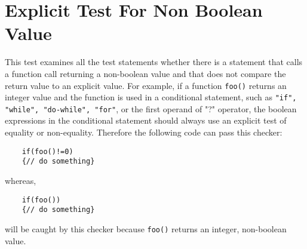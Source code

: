 %
%

\section{Explicit Test For Non Boolean Value}
\label{ExplicitTestForNonBooleanValue::overview}

   This test examines all the test statements whether there is a statement that calls a function call returning a non-boolean value and that does not compare the return value to an explicit value.
   For example, if a function \texttt{foo()} returns an integer value and the function is used in a conditional statement, such as \texttt{"if", "while", "do-while", "for"}, or the first operand of "?" operator, the boolean expressions in the conditional statement should always use an explicit test of equality or non-equality. Therefore the following code can pass this checker:

\begin{verbatim}
	if(foo()!=0)
	{// do something}
\end{verbatim}

whereas, 
\begin{verbatim}
	if(foo())
	{// do something}
\end{verbatim}

will be caught by this checker because \texttt{foo()} returns an integer, non-boolean value.

